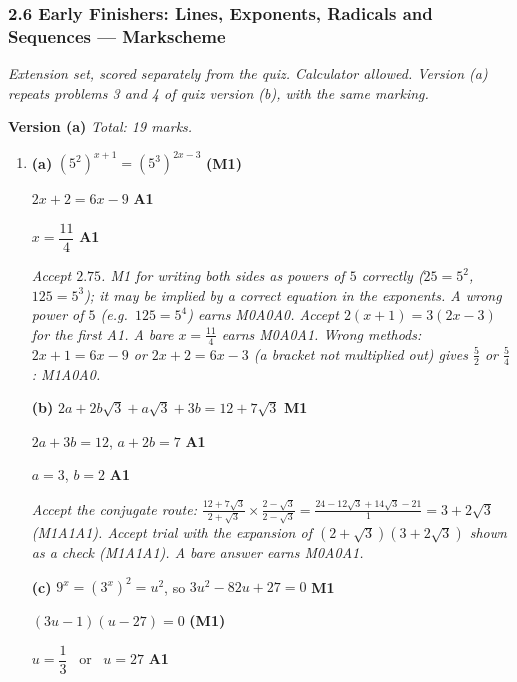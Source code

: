 \documentclass[12pt, twoside]{article}
\begin{document}
\subsubsection*{2.6 Early Finishers: Lines, Exponents, Radicals and Sequences --- Markscheme}

\emph{Extension set, scored separately from the quiz. Calculator allowed.
Version (a) repeats problems 3 and 4 of quiz version (b), with the same
marking.}

\textbf{\large Version (a)} \hfill \emph{Total: 19 marks.}

\begin{enumerate}[itemsep=0.3cm]

\item[1.] [Maximum mark: 11]

\textbf{(a)} $\left(5^{2}\right)^{x + 1} = \left(5^{3}\right)^{2x - 3}$ \hfill \textbf{(M1)}

$2x + 2 = 6x - 9$ \hfill \textbf{A1}

$x = \dfrac{11}{4}$ \hfill \textbf{A1}

\emph{Accept $2.75$. M1 for writing both sides as powers of $5$ correctly
($25 = 5^{2}$, $125 = 5^{3}$); it may be implied by a correct equation in the
exponents. A wrong power of $5$ (e.g.\ $125 = 5^{4}$) earns M0A0A0. Accept
$2(x + 1) = 3(2x - 3)$ for the first A1. A bare $x = \frac{11}{4}$ earns
M0A0A1. Wrong
methods: $2x + 1 = 6x - 9$ or $2x + 2 = 6x - 3$ (a bracket not multiplied
out) gives $\frac{5}{2}$ or $\frac{5}{4}$: M1A0A0.}

\textbf{(b)} $2a + 2b\sqrt{3} + a\sqrt{3} + 3b = 12 + 7\sqrt{3}$ \hfill \textbf{M1}

$2a + 3b = 12$, \quad $a + 2b = 7$ \hfill \textbf{A1}

$a = 3$, \quad $b = 2$ \hfill \textbf{A1}

\emph{Accept the conjugate route:
$\frac{12 + 7\sqrt{3}}{2 + \sqrt{3}} \times \frac{2 - \sqrt{3}}{2 - \sqrt{3}}
= \frac{24 - 12\sqrt{3} + 14\sqrt{3} - 21}{1} = 3 + 2\sqrt{3}$ (M1A1A1).
Accept trial with the expansion of $(2 + \sqrt{3})(3 + 2\sqrt{3})$ shown as
a check (M1A1A1). A bare answer earns M0A0A1.}

\textbf{(c)} $9^{x} = \left(3^{x}\right)^{2} = u^{2}$, so $3u^{2} - 82u + 27 = 0$ \hfill \textbf{M1}

$(3u - 1)(u - 27) = 0$ \hfill \textbf{(M1)}

$u = \dfrac{1}{3}$ \ or \ $u = 27$ \hfill \textbf{A1}


\end{enumerate}
\end{document}
